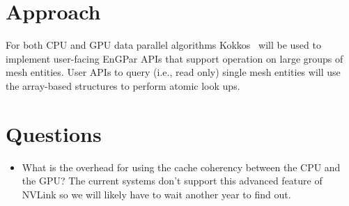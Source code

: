 \documentclass{article}
\begin{document}
\section{Approach}

For both CPU and GPU data parallel algorithms Kokkos~\cite{edwards2013kokkos}
will be used to implement user-facing EnGPar APIs that support operation on
large groups of mesh entities.
User APIs to query (i.e., read only) single mesh entities will use the
array-based structures to perform atomic look ups.

\section{Questions}
\begin{itemize}
  \item What is the overhead for using the cache coherency between the
    CPU and the GPU?
    The current systems don't support this advanced feature of NVLink so we will
    likely have to wait another year to find out.
\end{itemize}



\end{document}

